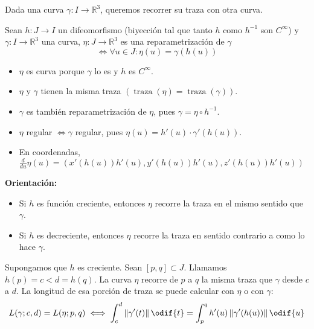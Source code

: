 \documentclass[12pt]{article}
\theoremstyle{plain}
\newcommand{\R}{\mathbb{R}}
\newcommand{\norm}[1]{\left\Vert#1\right\Vert}
\newcommand{\appl}[3]{#1 \colon #2 \longrightarrow #3}
\newcommand{\ds}{\displaystyle}
\newcommand{\trz}[1]{\operatorname{traza}\left(#1\right)}
\renewcommand{\norm}[1]{\left\Vert#1\right\Vert}
\begin{document}
Dada una curva $\appl{\gamma}{I}{\R^3}$, queremos recorrer su traza con otra curva.
\begin{defn}
	Sean $\appl{h}{J}{I}$ un difeomorfismo (biyección tal que tanto $h$ como $h^{-1}$ son $C^\infty$) y $\appl{\gamma}{I}{\R^3}$ una curva, $\appl{\eta}{J}{\R^3}$ es una reparametrización de $\gamma$
	\[ \iff \forall u \in J : \eta(u)=\gamma(h(u))\]
	\begin{itemize}[topsep=1pt, itemsep=1pt,parsep=3pt]
		\item $\eta$ es curva porque $\gamma$ lo es y $h$ es $C^\infty$.
		\item $\eta$ y $\gamma$ tienen la misma traza $(\trz{\eta}=\trz{\gamma})$.
		\item $\gamma$ es también reparametrización de $\eta$, pues $\gamma = \eta \circ h^{-1}$.
		\item $\eta$ regular $\iff \gamma$ regular, pues $\eta(u) = h'(u)\cdot\gamma'(h(u))$.
		\item En coordenadas, $\ds \frac{d}{du}\eta(u)=\left(x'(h(u))h'(u), y'(h(u))h'(u), z'(h(u))h'(u)\right)$
	\end{itemize}
\end{defn}
\noindent \textbf{Orientación:}
\begin{itemize}[topsep=0pt, itemsep=1pt,parsep=3pt]
	\item Si $h$ es función creciente, entonces $\eta$ recorre la traza en el mismo sentido que $\gamma$.
	\item Si $h$ es decreciente, entonces $\eta$ recorre la traza en sentido contrario a como lo hace $\gamma$.
\end{itemize}
Supongamos que $h$ es creciente. Sean $\left[p, q\right]\subset J$. Llamamos $h(p)=c<d=h(q)$. La curva $\eta$ recorre de $p$ a $q$ la misma traza que $\gamma$ desde $c$ a $d$. La longitud de esa porción de traza se puede calcular con $\eta$ o con $\gamma$:
\[L(\gamma; c, d)=L(\eta; p, q) \iff \int_c^d\norm{\gamma'(t)}\odif{t}=\int_p^qh'(u)\norm{\gamma'(h(u))}\odif{u}\]
\end{document}
